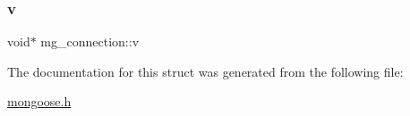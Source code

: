 \mbox{\label{structmg__connection_a1c70d397e2abcd97dfdee3311357f9cd_a1c70d397e2abcd97dfdee3311357f9cd}} 
\subsubsection{\texorpdfstring{v}{v}}
{\footnotesize\ttfamily void$\ast$ mg\+\_\+connection\+::v}



The documentation for this struct was generated from the following file\+:\begin{DoxyCompactItemize}
\item 
\hyperlink{mongoose_8h}{mongoose.\+h}\end{DoxyCompactItemize}
